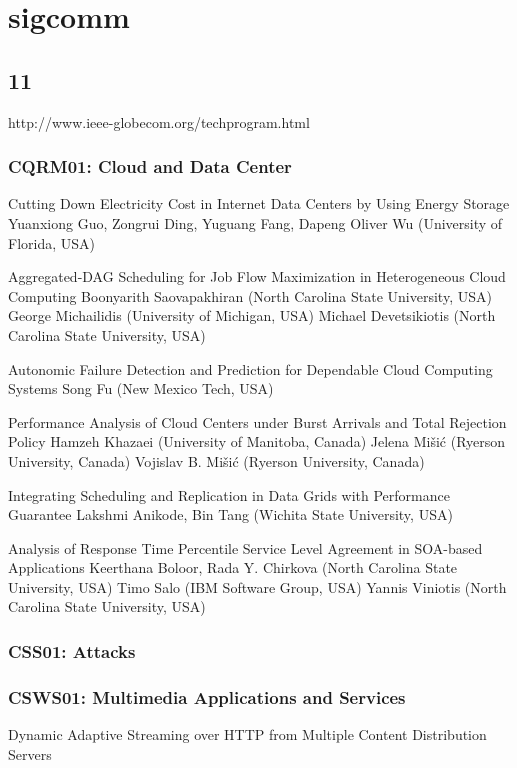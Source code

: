 \documentclass[•]{article}
\begin{document}
\section{sigcomm}
\subsection{11}
http://www.ieee-globecom.org/techprogram.html

\subsubsection{CQRM01: Cloud and Data Center}

Cutting Down Electricity Cost in Internet Data Centers by Using Energy Storage
Yuanxiong Guo, Zongrui Ding, Yuguang Fang, Dapeng Oliver Wu (University of Florida, USA)


Aggregated-DAG Scheduling for Job Flow Maximization in Heterogeneous Cloud Computing
Boonyarith Saovapakhiran (North Carolina State University, USA)
George Michailidis (University of Michigan, USA)
Michael Devetsikiotis (North Carolina State University, USA)

Autonomic Failure Detection and Prediction for Dependable Cloud Computing Systems
Song Fu (New Mexico Tech, USA)

Performance Analysis of Cloud Centers under Burst Arrivals and Total Rejection Policy
Hamzeh Khazaei (University of Manitoba, Canada)
Jelena Mišić (Ryerson University, Canada)
Vojislav B. Mišić (Ryerson University, Canada)

Integrating Scheduling and Replication in Data Grids with Performance Guarantee
Lakshmi Anikode, Bin Tang (Wichita State University, USA)

Analysis of Response Time Percentile Service Level Agreement in SOA-based Applications
Keerthana Boloor, Rada Y. Chirkova (North Carolina State University, USA)
Timo Salo (IBM Software Group, USA)
Yannis Viniotis (North Carolina State University, USA)

\subsubsection{CSS01: Attacks}

\subsubsection{CSWS01: Multimedia Applications and Services}
Dynamic Adaptive Streaming over HTTP from Multiple Content Distribution Servers
\end{document}
